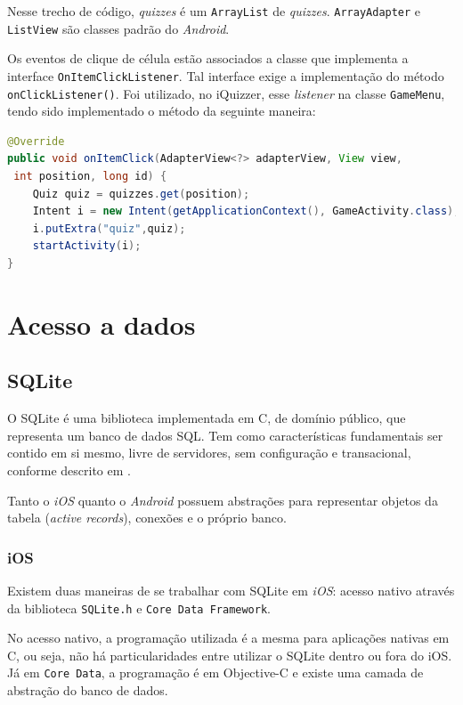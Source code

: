 	Nesse trecho de código, \emph{quizzes} é um \texttt{ArrayList} de \emph{quizzes}. \texttt{ArrayAdapter} e \texttt{ListView} são classes padrão do \emph{Android}.  
    
	Os eventos de clique de célula estão associados a classe que implementa a interface \texttt{OnItemClickListener}.  Tal interface exige a implementação do método \texttt{onClickListener()}. Foi utilizado, no iQuizzer, esse \emph{listener} na classe \texttt{GameMenu}, tendo sido implementado o método da seguinte maneira:
\begin{lstlisting}[language=Java]   
@Override
public void onItemClick(AdapterView<?> adapterView, View view,
 int position, long id) {
    Quiz quiz = quizzes.get(position);
    Intent i = new Intent(getApplicationContext(), GameActivity.class);
    i.putExtra("quiz",quiz);
    startActivity(i);
}
             \end{lstlisting}    
    \section {Acesso a dados}
     
    \subsection {SQLite}
	
            O  SQLite é uma biblioteca implementada em C, de domínio público, que representa um banco de dados SQL. Tem como características fundamentais ser contido em si mesmo, livre de servidores, sem configuração e transacional, conforme descrito em \cite{SQLite}.
            
			Tanto o \emph{iOS} quanto o \emph{Android} possuem abstrações para representar objetos da tabela (\emph{active records}), conexões e o próprio banco.
     
    \subsubsection{iOS}
            Existem duas maneiras de se trabalhar com SQLite em \emph{iOS}: acesso nativo através da biblioteca \texttt{SQLite.h} e \texttt{Core Data Framework}.
           
		    No acesso nativo, a programação utilizada é a mesma para aplicações nativas em C, ou seja, não há particularidades entre utilizar o SQLite dentro ou fora do iOS. Já em \texttt{Core Data}, a programação é em Objective-C e existe uma camada de abstração do banco de dados.
           
